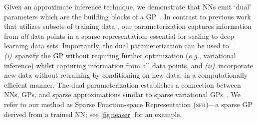 \documentclass{article}
\makeatletter
\newcommand{\eg}{\textit{e.g.\@}\xspace}
\newcommand{\ie}{\textit{i.e.\@}\xspace}
\newcommand{\our}{\textsc{sfr}\xspace}
\makeatother
\begin{document}
Given an approximate inference technique, we demonstrate that NNs emit `dual' parameters which are the building blocks of a GP~\citep{csato2002sparse, adam2021dual, chang2023memory}.
In contrast to previous work that utilizes subsets of training data \citep{immer2021scalable}, our parameterization captures
information from {\em all} data points in a sparse representation, essential for scaling to deep learning data sets.
Importantly, the dual parameterization can be used to {\em (i)}~sparsify the GP without requiring further optimization
(\eg, variational inference) whilst capturing information from all data points, and {\em (ii)}~incorporate new data without retraining by conditioning on new data, in a computationally efficient manner.
The dual parameterization establishes a connection between NNs, GPs, and sparse approximations similar to sparse variational GPs~\citep{titsias2009variational}. We refer to our method as Sparse Function-space Representation (\our)---a sparse GP derived from a trained NN; see \cref{fig:teaser} for an example. %
\end{document}

